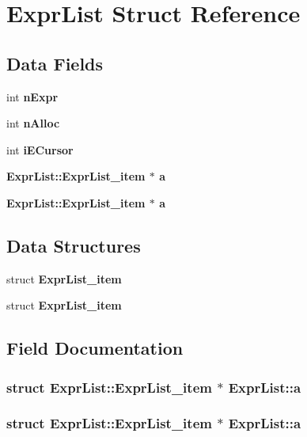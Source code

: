 \section{Expr\-List Struct Reference}
\label{structExprList}
\subsection*{Data Fields}
\begin{CompactItemize}
\item 
int \bf{n\-Expr}
\item 
int \bf{n\-Alloc}
\item 
int \bf{i\-ECursor}
\item 
\bf{Expr\-List::Expr\-List\_\-item} $\ast$ \bf{a}
\item 
\bf{Expr\-List::Expr\-List\_\-item} $\ast$ \bf{a}
\end{CompactItemize}
\subsection*{Data Structures}
\begin{CompactItemize}
\item 
struct \bf{Expr\-List\_\-item}
\item 
struct \bf{Expr\-List\_\-item}
\end{CompactItemize}


\subsection{Field Documentation}
\subsubsection{\setlength{\rightskip}{0pt plus 5cm}struct \bf{Expr\-List::Expr\-List\_\-item} $\ast$ \bf{Expr\-List::a}}\label{structExprList_4728e240ce1b4e186c3e5d01aad93ce9}


\subsubsection{\setlength{\rightskip}{0pt plus 5cm}struct \bf{Expr\-List::Expr\-List\_\-item} $\ast$ \bf{Expr\-List::a}}\label{structExprList_4728e240ce1b4e186c3e5d01aad93ce9}


